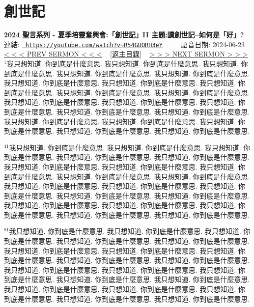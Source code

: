 \documentclass{book}
\begin{document}
\section{創世記}
\label{sec:R54GUORH3eY}
\textbf{2024 聖言系列 - 夏季培靈奮興會:「創世記」II 主題:讀創世記–如何是「好」?}
\newline
\newline
連結: \href{https://youtube.com/watch?v=R54GUORH3eY}{\texttt{ https://youtube.com/watch?v=R54GUORH3eY}} ~~~~ 語音日期: 2024-06-23 
\newline
\newline
\hyperref[sec:EZL_OCl_lJE]{\small{< < < PREV SERMON < < <}}
~
\hyperref[sec:index]{\small{[返主目錄]}}
~
\hyperref[sec:iBfE9eVripQ]{\small{> > > NEXT SERMON > > >}}
\newline
\newline
$^{1}$我只想知道.
你到底是什麼意思.
我只想知道.
你到底是什麼意思.
我只想知道.
你到底是什麼意思.
我只想知道.
你到底是什麼意思.
我只想知道.
你到底是什麼意思.
我只想知道.
你到底是什麼意思.
我只想知道.
你到底是什麼意思.
我只想知道.
你到底是什麼意思.
我只想知道.
你到底是什麼意思.
我只想知道.
你到底是什麼意思.
我只想知道.
你到底是什麼意思.
我只想知道.
你到底是什麼意思.
我只想知道.
你到底是什麼意思.
我只想知道.
你到底是什麼意思.
我只想知道.
你到底是什麼意思.
我只想知道.
你到底是什麼意思.
我只想知道.
你到底是什麼意思.
我只想知道.
你到底是什麼意思.
我只想知道.
你到底是什麼意思.
我只想知道.
你到底是什麼意思.

$^{41}$我只想知道.
你到底是什麼意思.
我只想知道.
你到底是什麼意思.
我只想知道.
你到底是什麼意思.
我只想知道.
你到底是什麼意思.
我只想知道.
你到底是什麼意思.
我只想知道.
你到底是什麼意思.
我只想知道.
你到底是什麼意思.
我只想知道.
你到底是什麼意思.
我只想知道.
你到底是什麼意思.
我只想知道.
你到底是什麼意思.
我只想知道.
你到底是什麼意思.
我只想知道.
你到底是什麼意思.
我只想知道.
你到底是什麼意思.
我只想知道.
你到底是什麼意思.
我只想知道.
你到底是什麼意思.
我只想知道.
你到底是什麼意思.
我只想知道.
你到底是什麼意思.
我只想知道.
你到底是什麼意思.
我只想知道.
你到底是什麼意思.
我只想知道.
你到底是什麼意思.

$^{81}$我只想知道.
你到底是什麼意思.
我只想知道.
你到底是什麼意思.
我只想知道.
你到底是什麼意思.
我只想知道.
你到底是什麼意思.
我只想知道.
你到底是什麼意思.
我只想知道.
你到底是什麼意思.
我只想知道.
你到底是什麼意思.
我只想知道.
你到底是什麼意思.
我只想知道.
你到底是什麼意思.
我只想知道.
你到底是什麼意思.
我只想知道.
你到底是什麼意思.
我只想知道.
你到底是什麼意思.
我只想知道.
你到底是什麼意思.
我只想知道.
你到底是什麼意思.
我只想知道.
你到底是什麼意思.
我只想知道.
你到底是什麼意思.
我只想知道.
你到底是什麼意思.
我只想知道.
你到底是什麼意思.
我只想知道.
你到底是什麼意思.
我只想知道.
你到底是什麼意思.
\end{document}
